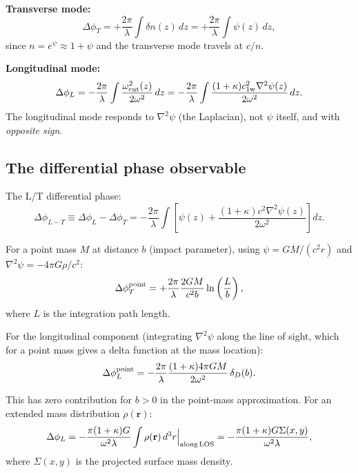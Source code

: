 \documentclass[11pt]{article}
\newcommand{\cfield}{c_{1\mathrm{w}}}
\begin{document}
\textbf{Transverse mode:}
\begin{equation}
\Delta\phi_T = +\frac{2\pi}{\lambda}\int \delta n(z)\,dz
= +\frac{2\pi}{\lambda}\int \psi(z)\,dz,
\label{eq:phi-T}
\end{equation}
since $n = e^\psi \approx 1 + \psi$ and the transverse mode
travels at $c/n$.

\textbf{Longitudinal mode:}
\begin{equation}
\Delta\phi_L = -\frac{2\pi}{\lambda}\int \frac{\omega_{\rm cut}^2(z)}
{2\omega^2}\,dz
= -\frac{2\pi}{\lambda}\int \frac{(1+\kappa)\cfield^2
\nabla^2\psi(z)}{2\omega^2}\,dz.
\label{eq:phi-L}
\end{equation}
The longitudinal mode responds to $\nabla^2\psi$ (the Laplacian),
not $\psi$ itself, and with \textit{opposite sign}.

\subsection{The differential phase observable}

The L/T differential phase:
\begin{equation}
\boxed{\Delta\phi_{L-T} \equiv \Delta\phi_L - \Delta\phi_T
= -\frac{2\pi}{\lambda}\int\left[\psi(z)
+ \frac{(1+\kappa)c^2\nabla^2\psi(z)}{2\omega^2}\right]dz.}
\label{eq:diff-phase}
\end{equation}

For a point mass $M$ at distance $b$ (impact parameter), using
$\psi = GM/(c^2 r)$ and $\nabla^2\psi = -4\pi G\rho/c^2$:
\begin{equation}
\Delta\phi_T^{\rm point} = +\frac{2\pi}{\lambda}
\frac{2GM}{c^2 b}\ln\left(\frac{L}{b}\right),
\end{equation}
where $L$ is the integration path length.

For the longitudinal component (integrating $\nabla^2\psi$ along
the line of sight, which for a point mass gives a delta function
at the mass location):
\begin{equation}
\Delta\phi_L^{\rm point} = -\frac{2\pi}{\lambda}
\frac{(1+\kappa)4\pi G M}{2\omega^2}\,\delta_D(b).
\end{equation}

This has zero contribution for $b > 0$ in the point-mass
approximation. For an extended mass distribution $\rho(\mathbf{r})$:
\begin{equation}
\Delta\phi_L = -\frac{\pi(1+\kappa)G}{\omega^2\lambda}
\int\rho(\mathbf{r})\,d^3r
\Big|_{\rm along\,LOS}
= -\frac{\pi(1+\kappa)G\Sigma(x,y)}{\omega^2\lambda},
\end{equation}
where $\Sigma(x,y)$ is the projected surface mass density.
\end{document}
